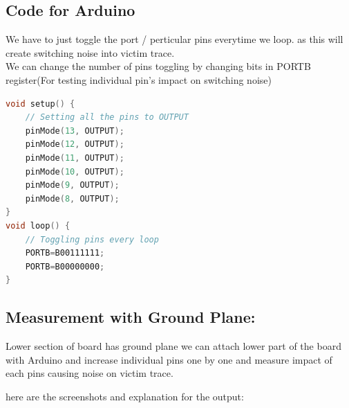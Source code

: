 \documentclass[a4paper,11pt]{article}%
\begin{document}
\subsection{Code for Arduino}
We have to just toggle the port / perticular pins everytime we loop. as this will create switching noise into victim trace.\\

We can change the number of pins toggling by changing bits in PORTB register(For testing individual pin's impact on switching noise)
\begin{lstlisting}[language=C]
void setup() {
	// Setting all the pins to OUTPUT
	pinMode(13, OUTPUT);
	pinMode(12, OUTPUT);
	pinMode(11, OUTPUT);
	pinMode(10, OUTPUT);
	pinMode(9, OUTPUT);
	pinMode(8, OUTPUT);
}
void loop() {
	// Toggling pins every loop
	PORTB=B00111111;
	PORTB=B00000000;
}
\end{lstlisting}


\subsection{Measurement with Ground Plane:}
Lower section of board has ground plane we can attach lower part of the board with Arduino and increase individual pins one by one and measure impact of each pins causing noise on victim trace.

here are the screenshots and explanation for the output:
\end{document}
